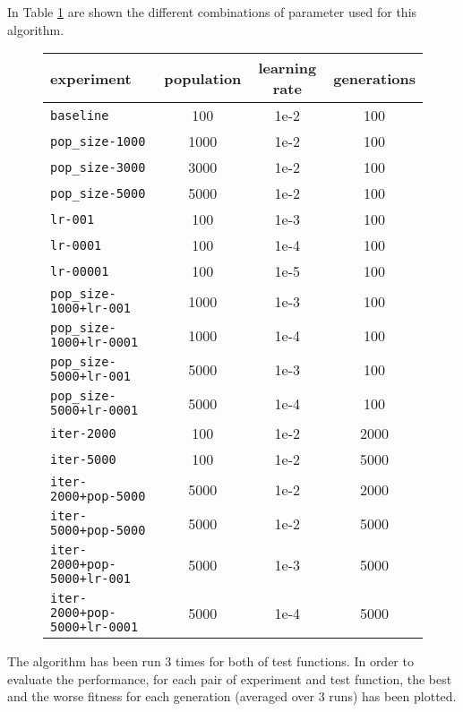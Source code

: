 In Table \ref{tab:nes-param} are shown the different combinations of parameter used for this algorithm.
\begin{figure}[htb]
	\centering
	
	\begin{tabular}{lccc}
		\toprule
		\textbf{experiment}  & \textbf{population} & \textbf{learning rate} &
		\textbf{generations} \\
		\midrule
		\texttt{baseline 						} & 100 	& 1e-2 	& 100\\
		\texttt{pop\_size-1000 					} & 1000 	& 1e-2 	& 100\\
		\texttt{pop\_size-3000 					} & 3000 	& 1e-2 	& 100\\
		\texttt{pop\_size-5000 					} & 5000 	& 1e-2 	& 100\\
		\texttt{lr-001 							} & 100 	& 1e-3 	& 100\\
		\texttt{lr-0001	 						} & 100 	& 1e-4 	& 100\\
		\texttt{lr-00001	 					} & 100 	& 1e-5 	& 100\\
		\texttt{pop\_size-1000+lr-001 			} & 1000 	& 1e-3 	& 100\\
		\texttt{pop\_size-1000+lr-0001 			} & 1000 	& 1e-4 	& 100\\
		\texttt{pop\_size-5000+lr-001 			} & 5000 	& 1e-3 	& 100\\
		\texttt{pop\_size-5000+lr-0001 			} & 5000 	& 1e-4 	& 100\\
		\texttt{iter-2000 						} & 100 	& 1e-2 	& 2000\\
		\texttt{iter-5000 						} & 100 	& 1e-2 	& 5000\\
		\texttt{iter-2000+pop-5000 	}			 & 5000 	& 1e-2 	& 2000\\
		\texttt{iter-5000+pop-5000 	}			 & 5000 	& 1e-2 	& 5000\\
		\texttt{iter-2000+pop-5000+lr-001 }		 & 5000 	& 1e-3 	& 5000\\
		\texttt{iter-2000+pop-5000+lr-0001 }	 & 5000 	& 1e-4 	& 5000\\
		\bottomrule
	\end{tabular}
	\label{tab:nes-param}
\end{figure}

The algorithm has been run 3 times for both of test functions. 
In order to evaluate the performance, for each pair of experiment and test function, the best and the worse fitness for each generation (averaged over 3 runs) has been plotted. 
\bigskip


